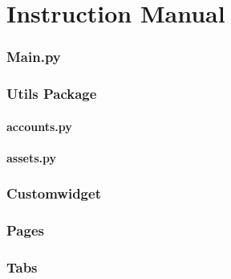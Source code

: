 \documentclass[12pt,a4paper]{article}
\begin{document}
\newpage

\part{ Instruction Manual }
\section{Main.py}

\section{Utils Package}

    \subsection{accounts.py}

    \subsection{assets.py}

\section{Customwidget}

\section{Pages}

\section{Tabs}

\end{document}
